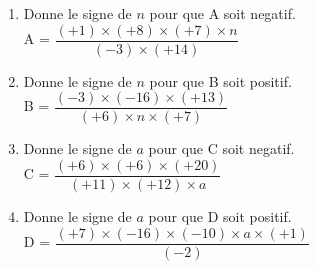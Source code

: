 \begin{exercice*}    
        \begin{enumerate}
            \item Donne le signe de $ n $ pour que A soit negatif. \\
            A = $ \dfrac {(+1)\times (+8)\times (+7)\times n}{(-3)\times (+14)} $ 
            \item Donne le signe de $ n $ pour que B soit positif. \\
            B = $ \dfrac {(-3)\times (-16)\times (+13)}{(+6)\times n\times (+7)} $ 
            \item Donne le signe de $ a $ pour que C soit negatif. \\
            C = $ \dfrac {(+6)\times (+6)\times (+20)}{(+11)\times (+12)\times a} $ 
            \item Donne le signe de $ a $ pour que D soit positif. \\
            D = $ \dfrac {(+7)\times (-16)\times (-10)\times a\times (+1)}{(-2)} $ 
        \end{enumerate}
\end{exercice*}
